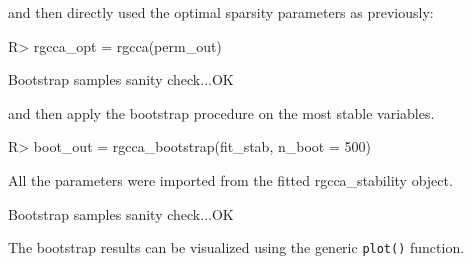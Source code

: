 \documentclass[
]{jss}
\begin{document}
\normalsize

and then directly used the optimal sparsity parameters as previously:

\footnotesize

\begin{CodeChunk}
\begin{CodeInput}
R> rgcca_opt = rgcca(perm_out)
\end{CodeInput}
\end{CodeChunk}

\normalsize

\footnotesize

\begin{CodeChunk}
\begin{CodeOutput}
Bootstrap samples sanity check...OK
\end{CodeOutput}
\end{CodeChunk}

\normalsize

and then apply the bootstrap procedure on the most stable variables.

\footnotesize

\begin{CodeChunk}
\begin{CodeInput}
R> boot_out = rgcca_bootstrap(fit_stab, n_boot = 500)
\end{CodeInput}
\begin{CodeOutput}
All the parameters were imported from the fitted rgcca_stability object.
\end{CodeOutput}
\begin{CodeOutput}
Bootstrap samples sanity check...OK
\end{CodeOutput}
\end{CodeChunk}

\normalsize

The bootstrap results can be visualized using the generic
\texttt{plot()} function.

\footnotesize
\end{document}
